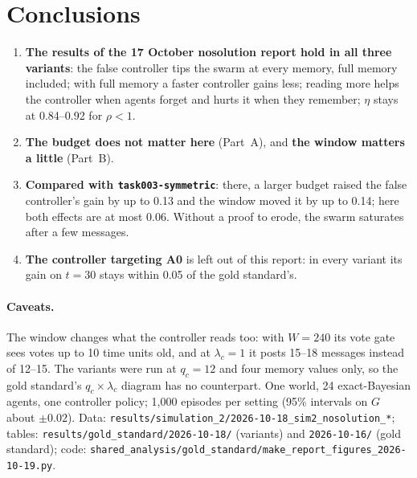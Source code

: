 \documentclass[10pt,a4paper]{article}
\begin{document}
\section{Conclusions}

\begin{enumerate}\itemsep2pt
\item \textbf{The results of the 17 October nosolution report hold in all three variants}: the false controller tips
  the swarm at every memory, full memory included; with full memory a faster controller gains less; reading more helps
  the controller when agents forget and hurts it when they remember; $\eta$ stays at 0.84--0.92 for $\rho < 1$.
\item \textbf{The budget does not matter here} (Part~A), and \textbf{the window matters a little} (Part~B).
\item \textbf{Compared with \texttt{task003-symmetric}}: there, a larger budget raised the false controller's gain by up
  to 0.13 and the window moved it by up to 0.14; here both effects are at most 0.06. Without a proof to erode, the
  swarm saturates after a few messages.
\item \textbf{The controller targeting A0} is left out of this report: in every variant its gain on $t = 30$ stays within
  0.05 of the gold standard's.
\end{enumerate}

\paragraph{Caveats.} The window changes what the controller reads too: with $W = 240$ its vote gate sees votes up to
10 time units old, and at $\lambda_c = 1$ it posts 15--18 messages instead of 12--15. The variants were run at
$q_c = 12$ and four memory values only, so the gold standard's $q_c \times \lambda_c$ diagram has no counterpart. One
world, 24 exact-Bayesian agents, one controller policy; 1{,}000 episodes per setting (95\% intervals on $G$ about
$\pm 0.02$). Data: \texttt{results/simulation\_2/2026-10-18\_sim2\_nosolution\_*}; tables:
\texttt{results/gold\_standard/2026-10-18/} (variants) and \texttt{2026-10-16/} (gold standard); code:
\texttt{shared\_analysis/gold\_standard/make\_report\_figures\_2026-10-19.py}.
\end{document}
